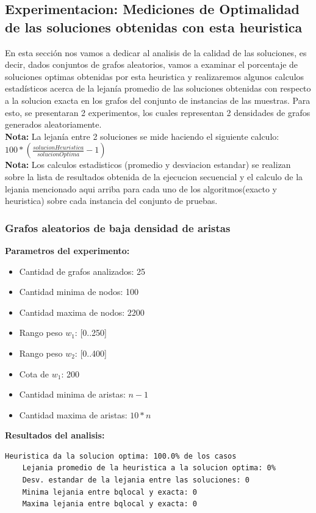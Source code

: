 \subsection{Experimentacion: Mediciones de Optimalidad de las soluciones obtenidas con esta heuristica}
En esta secci\'on nos vamos a dedicar al analisis de la calidad de las soluciones, es decir, dados conjuntos de grafos aleatorios, vamos a examinar el porcentaje de soluciones optimas obtenidas por esta heuristica y realizaremos algunos calculos estad\'isticos acerca de la lejan\'ia promedio de las soluciones obtenidas con respecto a la solucion exacta en los grafos del conjunto de instancias de las muestras. Para esto, se presentaran 2 experimentos, los cuales representan 2 densidades de grafos generados aleatoriamente.\\
\textbf{Nota: }La lejan\'ia entre 2 soluciones se mide haciendo el siguiente calculo: 
$ 100 *(\frac{solucionHeuristica}{solucionOptima} - 1)  $\\
\textbf{Nota: } Los calculos estadisticos (promedio y desviacion estandar) se realizan sobre la lista de resultados obtenida de la ejecucion secuencial y el calculo de la lejania mencionado aqui arriba para cada uno de los algoritmos(exacto y heuristica) sobre cada instancia del conjunto de pruebas.

\subsubsection{Grafos aleatorios de baja densidad de aristas}
\textbf{Parametros del experimento:}
\begin{itemize}
	\item Cantidad de grafos analizados: 25
	\item Cantidad minima de nodos: 100
	\item Cantidad maxima de nodos: 2200
	\item Rango peso $w_1$: [0..250]
	\item Rango peso $w_2$: [0..400]
	\item Cota de $w_1$: 200
	\item Cantidad minima de aristas: $n-1$
	\item Cantidad maxima de aristas: $10*n$
\end{itemize}

\textbf{Resultados del analisis:}
\begin{lstlisting}[frame=single]
	Heuristica da la solucion optima: 100.0% de los casos
	Lejania promedio de la heuristica a la solucion optima: 0%
	Desv. estandar de la lejania entre las soluciones: 0
	Minima lejania entre bqlocal y exacta: 0
	Maxima lejania entre bqlocal y exacta: 0
\end{lstlisting}

